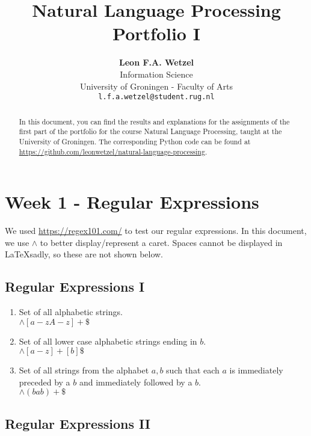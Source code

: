\documentclass[a4paper, 11pt]{article}
\title{\textbf{Natural Language Processing}\\Portfolio I}
\author{\textbf{Leon F.A. Wetzel}\\ Information Science \\ University of Groningen - Faculty of Arts\\ \texttt{l.f.a.wetzel@student.rug.nl}}
\begin{document}
\maketitle

\begin{abstract}
	
	In this document, you can find the results and explanations for the assignments of the first part of the portfolio for the course Natural Language Processing, taught at the University of Groningen. The corresponding Python code can be found at \url{https://github.com/leonwetzel/natural-language-processing}.

\end{abstract}

\section{Week 1 - Regular Expressions}

We used \url{https://regex101.com/} to test our regular expressions. In this document, we use \texttt{$\wedge$} to better display/represent a caret. Spaces cannot be displayed in \LaTeX  sadly, so these are not shown below.

\subsection{Regular Expressions I}

\begin{enumerate}
	\item Set of all alphabetic strings. \\ $ \wedge [a-zA-z ]+\$ $
	
	\item Set of all lower case alphabetic strings ending in $b$. \\ $\wedge [a-z ]+[b]\$ $
	
	\item Set of all strings from the alphabet ${a,b}$ such that each $a$ is immediately preceded by a $b$ and immediately followed by a $b$. \\$\wedge(bab)+\$ $
\end{enumerate}

\subsection{Regular Expressions II}
\end{document}
